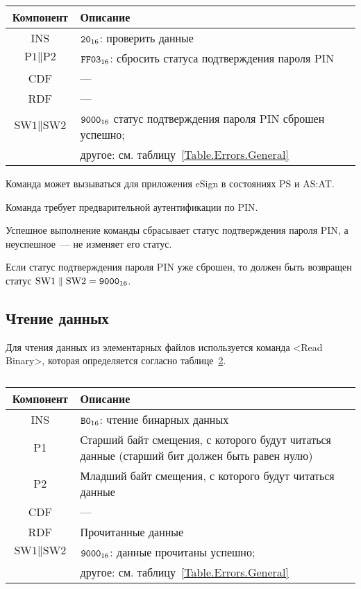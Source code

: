 \begin{table}[hbt]
\caption{}\label{Table.Oper.VerifyDeauthCmd}
\begin{tabular}{|c|p{14cm}|}
\hline
Компонент & Описание \\
\hline
\hline
INS & $\texttt{20}_{16}$: проверить данные\\
\hline
$\text{P1} \parallel \text{P2}$ & $\texttt{FF03}_{16}$: сбросить статуса подтверждения
пароля PIN  \\
\hline
CDF & ---  \\
\hline 
RDF &  --- \\
\hline
$\text{SW1} \parallel \text{SW2}$ & $\texttt{9000}_{16}$ 
статус подтверждения пароля PIN сброшен успешно;\\
& другое: см. таблицу~\ref{Table.Errors.General} \\
\hline
\end{tabular}
\end{table}

Команда может вызываться для приложения eSign  
в состояниях PS и AS:AT.

Команда требует предварительной аутентификации по PIN.

Успешное выполнение команды сбрасывает статус подтверждения пароля PIN,
а неуспешное~--- не изменяет его статус.

Если статус подтверждения пароля PIN уже сброшен, то должен быть возвращен статус
$\text{SW1} \parallel \text{SW2} = \texttt{9000}_{16}$.

\subsection{Чтение данных}
\label{Oper.Descr.Read}

Для чтения данных из элементарных файлов 
используется команда <Read Binary>, 
которая определяется согласно 
таблице~\ref{Table.Oper.ReadCmd}.

\begin{table}[hbt]
\caption{}\label{Table.Oper.ReadCmd}
\begin{tabular}{|c|p{14cm}|}
\hline
Компонент & Описание \\
\hline
\hline
INS & $\texttt{B0}_{16}$: чтение бинарных данных \\
\hline
P1 & Старший байт смещения, с которого будут читаться данные (старший бит 
должен быть равен нулю) \\
\hline
P2 & Младший байт смещения, с которого будут читаться данные\\
\hline
CDF &  --- \\
\hline 
RDF & 	Прочитанные данные \\
\hline
$\text{SW1} \parallel\text{SW2}$ & 
$\texttt{9000}_{16}$: данные прочитаны успешно; \\
& другое: см. таблицу~\ref{Table.Errors.General} \\
\hline
\end{tabular}
\end{table}

